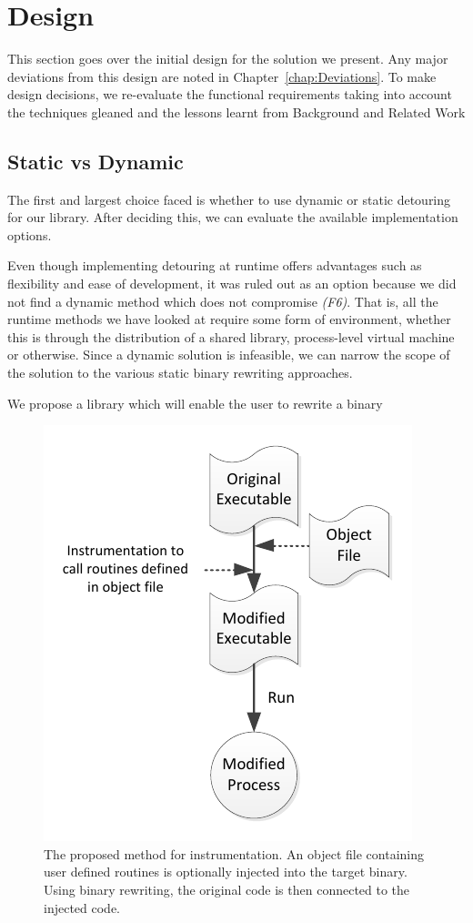 \chapter{Design}

This section goes over the initial design for the solution we present. Any major deviations from this design are noted in Chapter~\ref{chap:Deviations}. To make design decisions, we re-evaluate the functional requirements taking into account the techniques gleaned and the lessons learnt from Background and Related Work

\section{Static vs Dynamic}

The first and largest choice faced is whether to use dynamic or static detouring for our library. After deciding this, we can evaluate the available implementation options.

Even though implementing detouring at runtime offers advantages such as flexibility and ease of development, it was ruled out as an option because we did not find a dynamic method which does not compromise \emph{(F6)}. That is, all the runtime methods we have looked at require some form of environment, whether this is through the distribution of a shared library, process-level virtual machine or otherwise. Since a dynamic solution is infeasible, we can narrow the scope of the solution to the various static binary rewriting approaches.

We propose a library which will enable the user to rewrite a binary 

\begin{figure}[H]
 \centering
 \includegraphics{Workflow.pdf}
 \caption[Hierarchy]{The proposed method for instrumentation. An object file containing user defined routines is optionally injected into the target binary. Using binary rewriting, the original code is then connected to the injected code.}
\end{figure}



